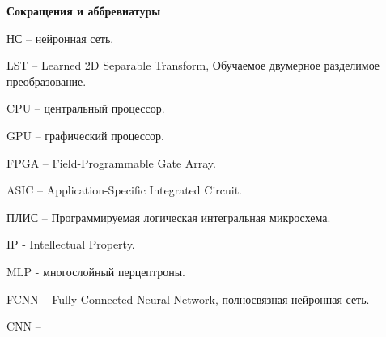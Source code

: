 \begin{center}
  \textbf{Сокращения и аббревиатуры}
\end{center}

НС – нейронная сеть. 

LST – Learned 2D Separable Transform, Обучаемое двумерное разделимое преобразование.

CPU – центральный процессор.

GPU – графический процессор.

FPGA – Field-Programmable Gate Array.

ASIC – Application-Specific Integrated Circuit.

ПЛИС – Программируемая логическая интегральная микросхема.

IP - Intellectual Property.

MLP - многослойный перцептроны.

FCNN – Fully Connected Neural Network, полносвязная нейронная сеть.

CNN –